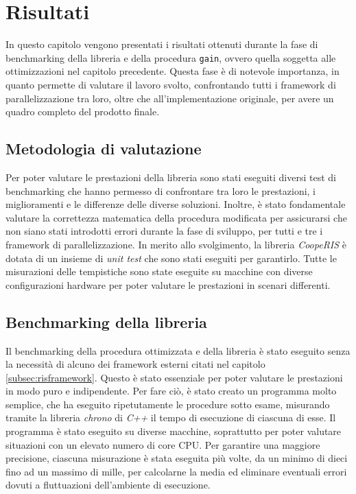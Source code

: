 \chapter{Risultati}
\label{ch:risultati}

In questo capitolo vengono presentati i risultati ottenuti durante la fase di
benchmarking della libreria e della procedura \texttt{gain}, ovvero quella
soggetta alle ottimizzazioni nel capitolo precedente. Questa fase è di notevole importanza,
in quanto permette di valutare il lavoro svolto, confrontando tutti i framework di
parallelizzazione tra loro, oltre che all'implementazione originale, per avere un
quadro completo del prodotto finale.

\section{Metodologia di valutazione}
\label{sec:bencharmking}

Per poter valutare le prestazioni della libreria sono stati eseguiti diversi
test di benchmarking che hanno permesso di confrontare tra loro le prestazioni, i
miglioramenti e le differenze delle diverse soluzioni. Inoltre, è stato fondamentale
valutare la correttezza matematica della procedura modificata per assicurarsi che
non siano stati introdotti errori durante la fase di sviluppo, per tutti e tre i
framework di parallelizzazione. In merito allo svolgimento, la libreria \textit{CoopeRIS}
è dotata di un insieme di \textit{unit test} che sono stati eseguiti per
garantirlo. Tutte le misurazioni delle tempistiche sono state eseguite su macchine
con diverse configurazioni hardware per poter valutare le prestazioni in scenari
differenti.

\section{Benchmarking della libreria}
\label{sec:benchmarking}

Il benchmarking della procedura ottimizzata e della libreria è stato eseguito
senza la necessità di alcuno dei framework esterni citati nel capitolo
\ref{subsec:risframework}. Questo è stato essenziale per poter valutare le prestazioni
in modo puro e indipendente. Per fare ciò, è stato creato un programma molto semplice,
che ha eseguito ripetutamente le procedure sotto esame, misurando tramite la libreria
\textit{chrono} di \textit{C++} il tempo di esecuzione di ciascuna di esse. Il
programma è stato eseguito su diverse macchine, soprattutto per poter valutare situazioni
con un elevato numero di core CPU. Per garantire una maggiore precisione, ciascuna
misurazione è stata eseguita più volte, da un minimo di dieci fino ad un massimo
di mille, per calcolarne la media ed eliminare eventuali errori dovuti a fluttuazioni
dell'ambiente di esecuzione.

